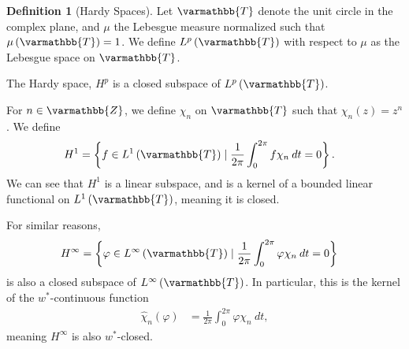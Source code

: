\documentclass[10pt]{extarticle}
\newcommand{\Z}{\mathbb{Z}}
\newcommand{\set}[1]{\left\{#1\right\}}
\theoremstyle{plain}
\theoremstyle{definition}
\newtheorem*{definition}{Definition}
\theoremstyle{note}
\renewcommand*{\mathbb}[1]{\varmathbb{#1}}
\renewcommand{\newline}{\hfill\break}
\begin{document}
\begin{definition}[Hardy Spaces]
  Let $\mathbb{T}$ denote the unit circle in the complex plane, and $\mu$ the Lebesgue measure normalized such that $\mu\left(\mathbb{T}\right) = 1$. We define $L^{p}\left(\mathbb{T}\right)$ with respect to $\mu$ as the Lebesgue space on $\mathbb{T}$.\newline

  The Hardy space, $H^{p}$ is a closed subspace of $L^{p}\left(\mathbb{T}\right)$.\newline

  For $n\in \Z$, we define $\chi_n$ on $\mathbb{T}$ such that $\chi_n(z) = z^n$. We define
  \begin{align*}
    H^1 &= \set{f\in L^{1}\left(\mathbb{T}\right) \mid \frac{1}{2\pi}\int_{0}^{2\pi}f\chi_n\:dt = 0}.
  \end{align*}
  We can see that $H^1$ is a linear subspace, and is a kernel of a bounded linear functional on $L^1\left(\mathbb{T}\right)$, meaning it is closed.\newline

  For similar reasons,
  \begin{align*}
    H^{\infty} &= \set{\varphi \in L^{\infty}\left(\mathbb{T}\right) \mid \frac{1}{2\pi}\int_{0}^{2\pi}\varphi \chi_n\:dt = 0}
  \end{align*}
  is also a closed subspace of $L^{\infty}\left(\mathbb{T}\right)$. In particular, this is the kernel of the $w^{\ast}$-continuous function
  \begin{align*}
    \hat{\chi}_n\left(\varphi\right) &= \frac{1}{2\pi}\int_{0}^{2\pi} \varphi \chi_n\:dt,
  \end{align*}
  meaning $H^{\infty}$ is also $w^{\ast}$-closed.
\end{definition}
\end{document}
